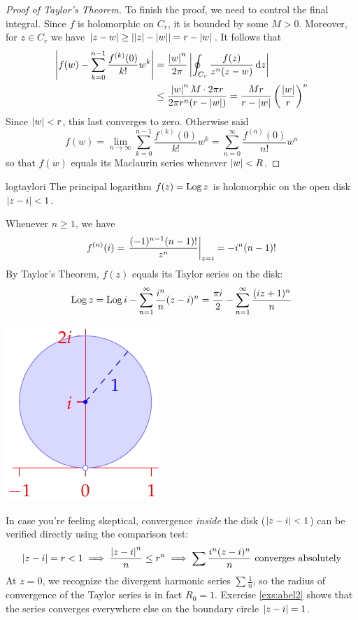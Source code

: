 \begin{proof}[Proof of Taylor's Theorem]
	To finish the proof, we need to control the final integral. Since $f$ is holomorphic on $C_r$, it is bounded by some $M>0$. Moreover, for $z\in C_r$ we have $\left| z-w\right|\ge \left| \left| z\right|-\left| w\right|\right|= r-\left| w\right|$. It follows that
	\begin{align*}
		\left| f(w)-\sum_{k=0}^{n-1} \frac{f^{(k)}(0)}{k!}w^k\right|
			&=\frac{\left| w\right|^n}{2\pi}\left| \oint_{C_r}\frac{f(z)}{z^n(z-w)}\,{\mathrm{d} z}\right|\\
			&\le\frac{\left| w\right|^nM\cdot 2\pi r}{2\pi r^n(r-\left| w\right|)}
				=\frac{Mr}{r-\left| w\right|}\left(\frac{\left| w\right|}r\right)^n 
	\end{align*}
	Since $\left| w\right|<r$, this last converges to zero. Otherwise said
	\[
		f(w)=\lim_{n\to\infty}\sum_{k=0}^{n-1} \frac{f^{(k)}(0)}{k!}w^k 
		=\sum_{n=0}^{\infty} \frac{f^{(n)}(0)}{n!}w^n
	\]
	so that $f(w)$ equals its Maclaurin series whenever $\left| w\right|<R$.
\end{proof}


\begin{example}{}{logtaylori}
	The principal logarithm $f(z)=\operatorname{Log} z$ is holomorphic on the open disk $\left| z-i\right|<1$.\par
  \begin{minipage}[t]{0.7\linewidth}\vspace{0pt}
  	Whenever $n\ge 1$, we have
		\[
			f^{(n)}(i)
			=\left.\frac{(-1)^{n-1}(n-1)!}{z^{n}}\right|_{z=i}
			=-i^n(n-1)!
		\]
		By Taylor's Theorem, $f(z)$ equals its Taylor series on the disk:
  	\[
  		\operatorname{Log} z=\operatorname{Log} i-\sum_{n=1}^\infty \frac{i^n}{n}(z-i)^n =\frac{\pi i}2-\sum_{n=1}^\infty \frac{(iz+1)^n}n
  	\]
  \end{minipage}
  \hfill
  \begin{minipage}[t]{0.29\linewidth}\vspace{0pt}
  	\flushright\includegraphics{taylorex2}
  \end{minipage}\medbreak
  
	In case you're feeling skeptical, convergence \emph{inside} the disk ($\left| z-i\right|<1$) can be verified directly using the comparison test:
	\[
		\left| z-i\right|=r<1\implies\frac{\left| z-i\right|^n}n\le r^n\implies \sum\frac{i^n(z-i)^n}n\text{ converges absolutely}
	\]
	At $z=0$, we recognize the divergent harmonic series $\sum \frac 1n$, so the radius of convergence of the Taylor series is in fact $R_0=1$. Exercise \ref{exs:abel2} shows that the series converges everywhere else on the boundary circle $\left| z-i\right|=1$.
\end{example}


